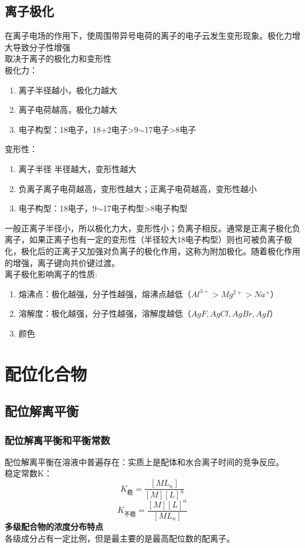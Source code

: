 \documentclass[utf8,a4paper,12pt]{ctexart}
\begin{document}
\subsection{离子极化}
在离子电场的作用下，使周围带异号电荷的离子的电子云发生变形现象。极化力增大导致分子性增强\\
取决于离子的极化力和变形性\\
极化力：
\begin{enumerate}[(1)]
\item 离子半径越小，极化力越大
\item 离子电荷越高，极化力越大
\item 电子构型：18电子，18+2电子>9$\sim$17电子>8电子
\end{enumerate}
变形性：
\begin{enumerate}[(1)]
\item 离子半径 半径越大，变形性越大
\item 负离子离子电荷越高，变形性越大；正离子电荷越高，变形性越小
\item 电子构型：18电子，9$\sim$17电子构型>8电子构型
\end{enumerate}
一般正离子半径小，所以极化力大，变形性小；负离子相反。通常是正离子极化负离子，如果正离子也有一定的变形性（半径较大18电子构型）则也可被负离子极化，极化后的正离子又加强对负离子的极化作用，这称为附加极化。随着极化作用的增强，离子键向共价键过渡。\\
离子极化影响离子的性质:
\begin{enumerate}[(1)]
\item 熔沸点：极化越强，分子性越强，熔沸点越低（$Al^{3+}>Mg^{2+}>Na^+$）
\item 溶解度：极化越强，分子性越强，溶解度越低（$AgF,AgCl,AgBr,AgI$）
\item 颜色
\end{enumerate}

\newpage
\section{配位化合物}
\subsection{配位解离平衡}
\subsubsection{配位解离平衡和平衡常数}
配位解离平衡在溶液中普遍存在：实质上是配体和水合离子时间的竞争反应。\\
稳定常数K：
\[
K_\text{稳} = \dfrac{[ML_n]}{[M][L]^n}
\]
\[
K_\text{不稳} = \dfrac{[M][L]^n}{[ML_n]}
\]
{\bf 多级配合物的浓度分布特点}\\
各级成分占有一定比例，但是最主要的是最高配位数的配离子。\\
\end{document}
